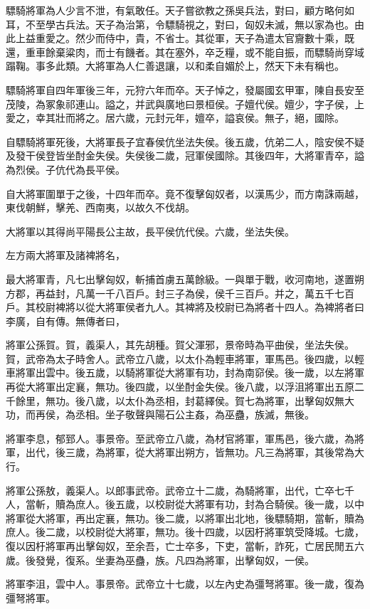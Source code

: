 驃騎將軍為人少言不泄，有氣敢任。天子嘗欲教之孫吳兵法，對曰，顧方略何如耳，不至學古兵法。天子為治第，令驃騎視之，對曰，匈奴未滅，無以家為也。由此上益重愛之。然少而侍中，貴，不省士。其從軍，天子為遣太官齎數十乘，既還，重車餘棄粱肉，而士有饑者。其在塞外，卒乏糧，或不能自振，而驃騎尚穿域蹋鞠。事多此類。大將軍為人仁善退讓，以和柔自媚於上，然天下未有稱也。

驃騎將軍自四年軍後三年，元狩六年而卒。天子悼之，發屬國玄甲軍，陳自長安至茂陵，為冢象祁連山。謚之，并武與廣地曰景桓侯。子嬗代侯。嬗少，字子侯，上愛之，幸其壯而將之。居六歲，元封元年，嬗卒，謚哀侯。無子，絕，國除。

自驃騎將軍死後，大將軍長子宜春侯伉坐法失侯。後五歲，伉弟二人，陰安侯不疑及發干侯登皆坐酎金失侯。失侯後二歲，冠軍侯國除。其後四年，大將軍青卒，謚為烈侯。子伉代為長平侯。

自大將軍圍單于之後，十四年而卒。竟不復擊匈奴者，以漢馬少，而方南誅兩越，東伐朝鮮，擊羌、西南夷，以故久不伐胡。

大將軍以其得尚平陽長公主故，長平侯伉代侯。六歲，坐法失侯。

左方兩大將軍及諸裨將名，

最大將軍青，凡七出擊匈奴，斬捕首虜五萬餘級。一與單于戰，收河南地，遂置朔方郡，再益封，凡萬一千八百戶。封三子為侯，侯千三百戶。并之，萬五千七百戶。其校尉裨將以從大將軍侯者九人。其裨將及校尉已為將者十四人。為裨將者曰李廣，自有傳。無傳者曰，

將軍公孫賀。賀，義渠人，其先胡種。賀父渾邪，景帝時為平曲侯，坐法失侯。賀，武帝為太子時舍人。武帝立八歲，以太仆為輕車將軍，軍馬邑。後四歲，以輕車將軍出雲中。後五歲，以騎將軍從大將軍有功，封為南窌侯。後一歲，以左將軍再從大將軍出定襄，無功。後四歲，以坐酎金失侯。後八歲，以浮沮將軍出五原二千餘里，無功。後八歲，以太仆為丞相，封葛繹侯。賀七為將軍，出擊匈奴無大功，而再侯，為丞相。坐子敬聲與陽石公主姦，為巫蠱，族滅，無後。

將軍李息，郁郅人。事景帝。至武帝立八歲，為材官將軍，軍馬邑，後六歲，為將軍，出代，後三歲，為將軍，從大將軍出朔方，皆無功。凡三為將軍，其後常為大行。

將軍公孫敖，義渠人。以郎事武帝。武帝立十二歲，為騎將軍，出代，亡卒七千人，當斬，贖為庶人。後五歲，以校尉從大將軍有功，封為合騎侯。後一歲，以中將軍從大將軍，再出定襄，無功。後二歲，以將軍出北地，後驃騎期，當斬，贖為庶人。後二歲，以校尉從大將軍，無功。後十四歲，以因杅將軍筑受降城。七歲，復以因杅將軍再出擊匈奴，至余吾，亡士卒多，下吏，當斬，詐死，亡居民閒五六歲。後發覺，復系。坐妻為巫蠱，族。凡四為將軍，出擊匈奴，一侯。

將軍李沮，雲中人。事景帝。武帝立十七歲，以左內史為彊弩將軍。後一歲，復為彊弩將軍。

